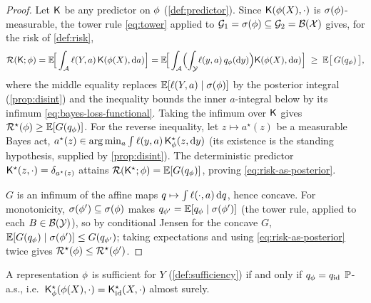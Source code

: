 \begin{proof}
Let $\mathsf{K}$ be any predictor on $\phi$ (\cref{def:predictor}). Since
$\mathsf{K}(\phi(X),\cdot)$ is $\sigma\!\left(\phi\right)$-measurable, the tower rule
\eqref{eq:tower} applied to $\mathcal{G}_1=\sigma\!\left(\phi\right)\subseteq
\mathcal{G}_2=\mathcal{B}(\mathcal{X})$ gives, for the risk of \cref{def:risk},
\[
  \mathcal{R}(\mathsf{K};\phi)
  = \mathbb{E}\!\Big[\int_{\mathcal{A}}\ell(Y,a)\,\mathsf{K}(\phi(X),\mathrm{d}a)\Big]
  = \mathbb{E}\!\Big[\int_{\mathcal{A}}\!\Big(\!\int_{\mathcal{Y}}\!\ell(y,a)\,q_{\phi}(\mathrm{d}y)\Big)
        \mathsf{K}(\phi(X),\mathrm{d}a)\Big]
  \;\ge\; \mathbb{E}\big[\,G(q_{\phi})\,\big],
\]
where the middle equality replaces $\mathbb{E}[\ell(Y,a)\mid\sigma\!\left(\phi\right)]$ by the
posterior integral (\cref{prop:disint}) and the inequality bounds the inner
$a$-integral below by its infimum \eqref{eq:bayes-loss-functional}. Taking the
infimum over $\mathsf{K}$ gives $\mathcal{R}^{\star}(\phi)\ge\mathbb{E}[G(q_{\phi})]$. For
the reverse inequality, let $z\mapsto a^{\star}(z)$ be a measurable Bayes act,
$a^{\star}(z)\in\arg\min_{a}\int\ell(y,a)\,\mathsf{K}^{\star}_{\phi}(z,\mathrm{d}y)$ (its
existence is the standing hypothesis, supplied by \cref{prop:disint}). The
deterministic predictor $\mathsf{K}^{\star}(z,\cdot)=\delta_{a^{\star}(z)}$
attains $\mathcal{R}(\mathsf{K}^{\star};\phi)=\mathbb{E}[G(q_{\phi})]$, proving
\eqref{eq:risk-as-posterior}.

$G$ is an infimum of the affine maps $q\mapsto\int\ell(\cdot,a)\,\mathrm{d}q$,
hence concave. For monotonicity, $\sigma\!\left(\phi'\right)\subseteq\sigma\!\left(\phi\right)$ makes
$q_{\phi'}=\mathbb{E}[q_{\phi}\mid\sigma\!\left(\phi'\right)]$ (the tower rule, applied to each
$B\in\mathcal{B}(\mathcal{Y})$), so by conditional Jensen for the concave $G$,
$\mathbb{E}[G(q_{\phi})\mid\sigma\!\left(\phi'\right)]\le G(q_{\phi'})$; taking expectations
and using \eqref{eq:risk-as-posterior} twice gives
$\mathcal{R}^{\star}(\phi)\le\mathcal{R}^{\star}(\phi')$.
\end{proof}

\begin{lemma}
\label{lem:suff-collapse}
A representation $\phi$ is sufficient for $Y$ (\cref{def:sufficiency}) if and
only if $q_{\phi}=q_{\mathrm{id}}$ $\mathbb{P}$-a.s., i.e.\
$\mathsf{K}^{\star}_{\phi}(\phi(X),\cdot)=\mathsf{K}^{\star}_{\mathrm{id}}(X,\cdot)$ almost surely.
\end{lemma}


